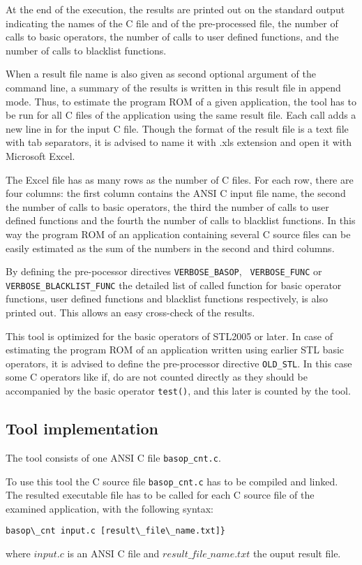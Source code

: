 At the end of the execution, the results are printed out on the
standard output indicating the names of the C file and of the
pre-processed file, the number of calls to basic operators, the number
of calls to user defined functions, and the number of calls to
blacklist functions.

When a result file name is also given as second optional argument of
the command line, a summary of the results is written in this result
file in append mode. Thus, to estimate the program ROM of a given
application, the tool has to be run for all C files of the application
using the same result file. Each call adds a new line in for the input
C file. Though the format of the result file is a text file with tab
separators, it is advised to name it with .xls extension and open it
with Microsoft Excel.

The Excel file has as many rows as the number of C files. For each
row, there are four columns: the first column contains the ANSI C
input file name, the second the number of calls to basic operators,
the third the number of calls to user defined functions and the fourth
the number of calls to blacklist functions. In this way the program
ROM of an application containing several C source files can be easily
estimated as the sum of the numbers in the second and third columns.

By defining the pre-pocessor directives {\tt VERBOSE\_BASOP}, {\tt
VERBOSE\_FUNC} or\\ {\tt VERBOSE\_BLACKLIST\_FUNC} the detailed list
of called function for basic operator functions, user defined
functions and blacklist functions respectively, is also printed
out. This allows an easy cross-check of the results.

This tool is optimized for the basic operators of STL2005 or later. In
case of estimating the program ROM of an application written using
earlier STL basic operators, it is advised to define the pre-processor
directive {\tt OLD\_STL}. In this case some C operators like if, do
are not counted directly as they should be accompanied by the basic
operator {\tt test()}, and this later is counted by the tool.

\subsection{Tool implementation}
The tool consists of one ANSI C file {\tt basop\_cnt.c}.

To use this tool the C source file {\tt basop\_cnt.c} has to be
compiled and linked. The resulted executable file has to be called for
each C source file of the examined application, with the following
syntax:
\begin{verbatim}
basop\_cnt input.c [result\_file\_name.txt]}
\end{verbatim}
where $input.c$ is an ANSI C file and $result\_file\_name.txt$ the
ouput result file.


